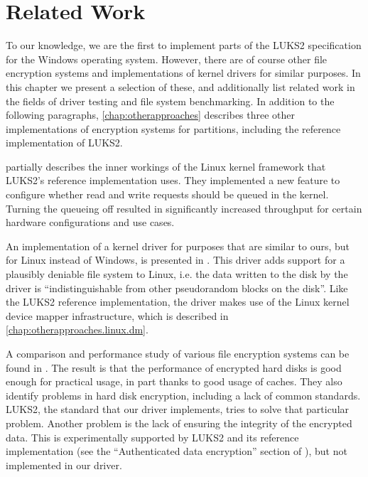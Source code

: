 \chapter{Related Work}
\label{chap:relatedwork}
To our knowledge, we are the first to implement parts of the LUKS2 specification for the Windows operating system. However, there are of course other file encryption systems and implementations of kernel drivers for similar purposes. In this chapter we present a selection of these, and additionally list related work in the fields of driver testing and file system benchmarking. In addition to the following paragraphs, \autoref{chap:otherapproaches} describes three other implementations of encryption systems for partitions, including the reference implementation of LUKS2.

\cite{Korchagin2020} partially describes the inner workings of the Linux kernel framework that LUKS2's reference implementation uses. They implemented a new feature to configure whether read and write requests should be queued in the kernel. Turning the queueing off resulted in significantly increased throughput for certain hardware configurations and use cases. 

An implementation of a kernel driver for purposes that are similar to ours, but for Linux instead of Windows, is presented in \cite{Barker2019}. This driver adds support for a plausibly deniable file system to Linux, i.e. the data written to the disk by the driver is ``indistinguishable from other pseudorandom blocks on the disk''. Like the LUKS2 reference implementation, the driver makes use of the Linux kernel device mapper infrastructure, which is described in \autoref{chap:otherapproaches.linux.dm}.

A comparison and performance study of various file encryption systems can be found in \cite{Wright2003}. The result is that the performance of encrypted hard disks is good enough for practical usage, in part thanks to good usage of caches. They also identify problems in hard disk encryption, including a lack of common standards. LUKS2, the standard that our driver implements, tries to solve that particular problem. Another problem is the lack of ensuring the integrity of the encrypted data. This is experimentally supported by LUKS2 and its reference implementation (see the ``Authenticated data encryption'' section of \cite{ManCryptsetup}), but not implemented in our driver.

